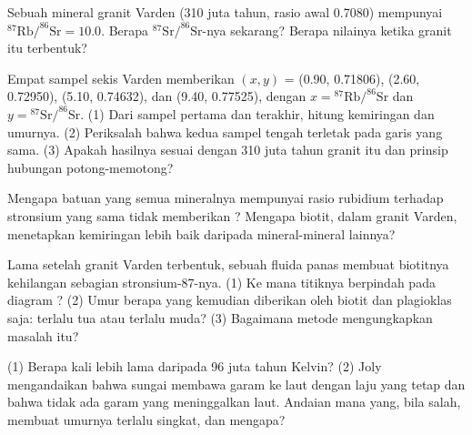 \begin{exercise}[$\star\star$]\label{exo:g12:age-of-the-earth:6}
Sebuah mineral granit Varden (310 juta tahun, rasio awal 0.7080)
mempunyai $^{87}\mathrm{Rb}/^{86}\mathrm{Sr} = 10.0$. Berapa
$^{87}\mathrm{Sr}/^{86}\mathrm{Sr}$-nya sekarang? Berapa nilainya ketika
granit itu terbentuk?
\end{exercise}

\begin{exercise}[$\star\star$]\label{exo:g12:age-of-the-earth:7}
Empat sampel sekis Varden memberikan $(x, y)$ = (0.90, 0.71806),
(2.60, 0.72950), (5.10, 0.74632), dan (9.40, 0.77525), dengan $x =
{}^{87}\mathrm{Rb}/^{86}\mathrm{Sr}$ dan $y = {}^{87}\mathrm{Sr}/^{86}\mathrm{Sr}$.
(1) Dari sampel pertama dan terakhir, hitung kemiringan dan umurnya.
(2) Periksalah bahwa kedua sampel tengah terletak pada garis yang sama.
(3) Apakah hasilnya sesuai dengan 310 juta tahun granit itu dan prinsip
hubungan potong-memotong?
\end{exercise}

\begin{exercise}[$\star\star$]\label{exo:g12:age-of-the-earth:8}
Mengapa batuan yang semua mineralnya mempunyai rasio rubidium terhadap
stronsium yang sama tidak memberikan ? Mengapa biotit, dalam granit
Varden, menetapkan kemiringan lebih baik daripada mineral-mineral lainnya?
\end{exercise}

\begin{exercise}[$\star\star$]\label{exo:g12:age-of-the-earth:9}
Lama setelah granit Varden terbentuk, sebuah fluida panas membuat biotitnya
kehilangan sebagian stronsium-87-nya. (1) Ke mana titiknya berpindah pada
diagram ? (2) Umur berapa yang kemudian diberikan oleh biotit dan
plagioklas saja: terlalu tua atau terlalu muda? (3) Bagaimana metode 
mengungkapkan masalah itu?
\end{exercise}

\begin{exercise}[$\star\star$]\label{exo:g12:age-of-the-earth:10}
(1) Berapa kali lebih lama  daripada 96 juta tahun Kelvin? (2) Joly
mengandaikan bahwa sungai membawa garam ke laut dengan laju yang tetap dan
bahwa tidak ada garam yang meninggalkan laut. Andaian mana yang, bila salah,
membuat umurnya terlalu singkat, dan mengapa?
\end{exercise}

